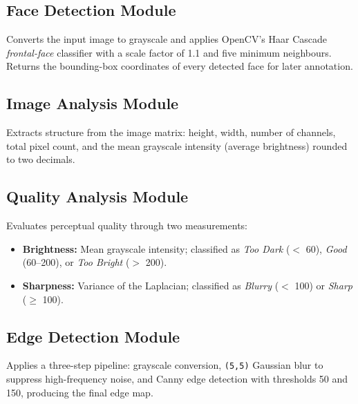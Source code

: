 \documentclass[11pt,a4paper]{article}
\begin{document}
\subsection{Face Detection Module}
Converts the input image to grayscale and applies OpenCV's Haar Cascade \emph{frontal-face} classifier with a scale factor of 1.1 and five minimum neighbours. Returns the bounding-box coordinates of every detected face for later annotation.

\subsection{Image Analysis Module}
Extracts structure from the image matrix: height, width, number of channels, total pixel count, and the mean grayscale intensity (average brightness) rounded to two decimals.

\subsection{Quality Analysis Module}
Evaluates perceptual quality through two measurements:
\begin{itemize}[leftmargin=1.5em]
    \item \textbf{Brightness:} Mean grayscale intensity; classified as \emph{Too Dark} ($<$ 60), \emph{Good} (60--200), or \emph{Too Bright} ($>$ 200).
    \item \textbf{Sharpness:} Variance of the Laplacian; classified as \emph{Blurry} ($<$ 100) or \emph{Sharp} ($\geq$ 100).
\end{itemize}

\subsection{Edge Detection Module}
Applies a three-step pipeline: grayscale conversion, \texttt{(5,5)} Gaussian blur to suppress high-frequency noise, and Canny edge detection with thresholds 50 and 150, producing the final edge map.

\end{document}
